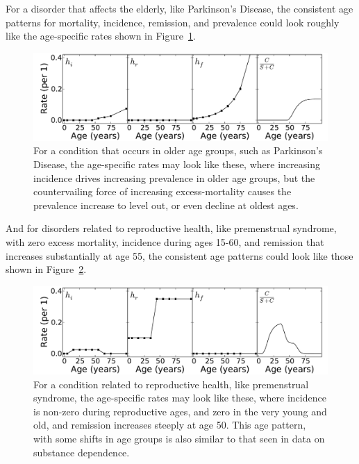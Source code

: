 For a disorder that affects the elderly, like Parkinson's Disease, the consistent age patterns for mortality, incidence, remission, and prevalence could look roughly like the age-specific rates shown in Figure~\ref{forward-sim-old-age}.

\begin{figure}[h]
\begin{center}
\includegraphics[width=\textwidth]{forward-sim-old_age.pdf}
\caption{For a condition that occurs in older age groups, such as Parkinson's Disease, the age-specific rates may look like these, where increasing incidence drives increasing prevalence in older age groups, but the countervailing force of increasing excess-mortality causes the prevalence increase to level out, or even decline at oldest ages.}
\label{forward-sim-old-age}
\end{center}
\end{figure}

And for disorders related to reproductive health, like premenstrual syndrome, with zero excess mortality, incidence during ages 15-60, and remission that increases substantially at age 55, the consistent age patterns could look like those shown in Figure~\ref{forward-sim-reproductive}.

\begin{figure}[h]
\begin{center}
\includegraphics[width=\textwidth]{forward-sim-reproductive.pdf}
\caption{For a condition related to reproductive health, like premenstrual syndrome, the age-specific rates may look like these, where incidence is non-zero during reproductive ages, and zero in the very young and old, and remission increases steeply at age 50. This age pattern, with some shifts in age groups is also similar to that seen in data on substance dependence.}
\label{forward-sim-reproductive}
\end{center}
\end{figure}



